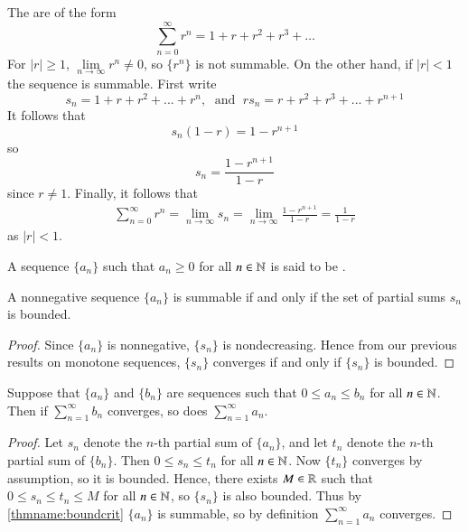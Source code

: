 \begin{eg}
    The  are of the form \begin{equation*}
        \sum\limits_{n=0}^{\infty}r^n = 1+r+r^2+r^3+\hdots
    \end{equation*}
    For $|r| \geq 1$, $\lim\limits_{n\rightarrow \infty}r^n \neq 0$, so $\{r^n\}$ is not summable. On the other hand, if $|r| < 1$ the sequence is summable. First write $$s_n = 1+r+r^2+...+r^n,\;\text{ and }\;rs_n = r+r^2+r^3+...+r^{n+1}$$
    It follows that $$s_n(1-r) = 1 - r^{n+1}$$ so $$s_n = \frac{1-r^{n+1}}{1-r}$$ since $r \neq 1$. Finally, it follows that \begin{align*}
        \sum\limits_{n=0}^{\infty}r^n = \lim\limits_{n\rightarrow \infty}s_n = \lim\limits_{n\rightarrow \infty}\frac{1-r^{n+1}}{1-r} = \frac{1}{1-r}
    \end{align*}
    as $|r| < 1$.
\end{eg}

\begin{defn}
    A sequence $\{a_n\}$ such that $a_n\geq 0$ for all $n \in \mathbb N$ is said to be .
\end{defn}

\begin{namthm}\label{thmname:boundcrit}
    A nonnegative sequence $\{a_n\}$ is summable if and only if the set of partial sums $s_n$ is bounded.
\end{namthm}
\begin{proof}
    Since $\{a_n\}$ is nonnegative, $\{s_n\}$ is nondecreasing. Hence from our previous results on monotone sequences, $\{s_n\}$ converges if and only if $\{s_n\}$ is bounded.
\end{proof}


\begin{namthm}\label{thmname:comptest}
    Suppose that $\{a_n\}$ and $\{b_n\}$ are sequences such that $0 \leq a_n \leq b_n$ for all $n \in \mathbb N$. Then if $\sum\limits_{n=1}^{\infty}b_n$ converges, so does $\sum\limits_{n=1}^{\infty}a_n$.
\end{namthm}
\begin{proof}
    Let $s_n$ denote the $n$-th partial sum of $\{a_n\}$, and let $t_n$ denote the $n$-th partial sum of $\{b_n\}$. Then $0 \leq s_n \leq t_n$ for all $n \in \mathbb N$. Now $\{t_n\}$ converges by assumption, so it is bounded. Hence, there exists $M \in \mathbb R$ such that $0 \leq s_n \leq t_n \leq M$ for all $n\in \mathbb N$, so $\{s_n\}$ is also bounded. Thus by \ref{thmname:boundcrit} $\{a_n\}$ is summable, so by definition $\sum\limits_{n=1}^{\infty}a_n$ converges.
\end{proof}


